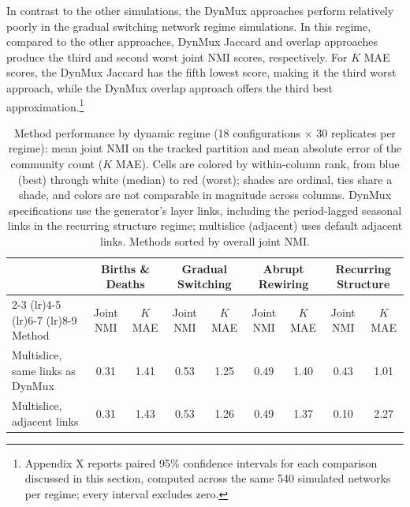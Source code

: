 \documentclass[11pt, letterpaper]{article}
\begin{document}
In contrast to the other simulations, the DynMux approaches perform relatively poorly in the gradual switching network regime simulations. In this regime, compared to the other approaches, DynMux Jaccard and overlap approaches produce the third and second worst joint NMI scores, respectively. For $K$ MAE scores, the DynMux Jaccard has the fifth lowest score, making it the third worst approach, while the DynMux overlap approach offers the third best approximation.\footnote{Appendix X reports paired 95\% confidence intervals for each comparison discussed in this section, computed across the same 540 simulated networks per regime; every interval excludes zero.}  


\begin{table}[t]
\scriptsize
\centering
\caption{Method performance by dynamic regime (18 configurations $\times$ 30 replicates per regime): mean joint NMI on the tracked partition and mean absolute error of the community count ($K$ MAE). Cells are colored by within-column rank, from blue (best) through white (median) to red (worst); shades are ordinal, ties share a shade, and colors are not comparable in magnitude across columns. DynMux specifications use the generator's layer links, including the period-lagged seasonal links in the recurring structure regime; multislice (adjacent) uses default adjacent links. Methods sorted by overall joint NMI.}
\label{tab:metrics_wide}
\begin{tabular}{lcccccccc}
\toprule
& \multicolumn{2}{c}{Births \& Deaths} & \multicolumn{2}{c}{Gradual Switching} & \multicolumn{2}{c}{Abrupt Rewiring} & \multicolumn{2}{c}{Recurring Structure} \\
\cmidrule(lr){2-3} \cmidrule(lr){4-5} \cmidrule(lr){6-7} \cmidrule(lr){8-9}
Method & Joint NMI & $K$ MAE & Joint NMI & $K$ MAE & Joint NMI & $K$ MAE & Joint NMI & $K$ MAE \\
\midrule
Multislice, same links as DynMux & 0.31 & 1.41 & 0.53 & 1.25 & 0.49 & 1.40 & 0.43 & 1.01 \\
Multislice, adjacent links & 0.31 & 1.43 & 0.53 & 1.26 & 0.49 & 1.37 & 0.10 & 2.27 \\

\end{tabular}
\end{table}
\end{document}
